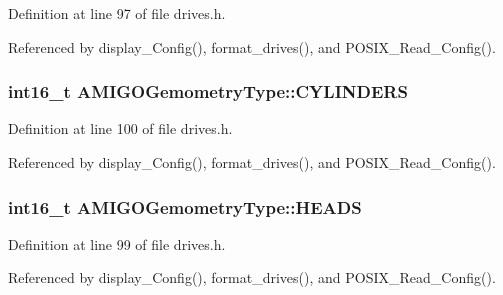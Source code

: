 Definition at line 97 of file drives.\+h.



Referenced by display\+\_\+\+Config(), format\+\_\+drives(), and P\+O\+S\+I\+X\+\_\+\+Read\+\_\+\+Config().

\subsubsection[{\texorpdfstring{C\+Y\+L\+I\+N\+D\+E\+RS}{CYLINDERS}}]{\setlength{\rightskip}{0pt plus 5cm}int16\+\_\+t A\+M\+I\+G\+O\+Gemometry\+Type\+::\+C\+Y\+L\+I\+N\+D\+E\+RS}\hypertarget{structAMIGOGemometryType_a4282aeb6c4aac3b8cfc09e29402dcd3f}{}\label{structAMIGOGemometryType_a4282aeb6c4aac3b8cfc09e29402dcd3f}


Definition at line 100 of file drives.\+h.



Referenced by display\+\_\+\+Config(), format\+\_\+drives(), and P\+O\+S\+I\+X\+\_\+\+Read\+\_\+\+Config().

\subsubsection[{\texorpdfstring{H\+E\+A\+DS}{HEADS}}]{\setlength{\rightskip}{0pt plus 5cm}int16\+\_\+t A\+M\+I\+G\+O\+Gemometry\+Type\+::\+H\+E\+A\+DS}\hypertarget{structAMIGOGemometryType_a33131d3948935e2064af9af151653033}{}\label{structAMIGOGemometryType_a33131d3948935e2064af9af151653033}


Definition at line 99 of file drives.\+h.



Referenced by display\+\_\+\+Config(), format\+\_\+drives(), and P\+O\+S\+I\+X\+\_\+\+Read\+\_\+\+Config().

